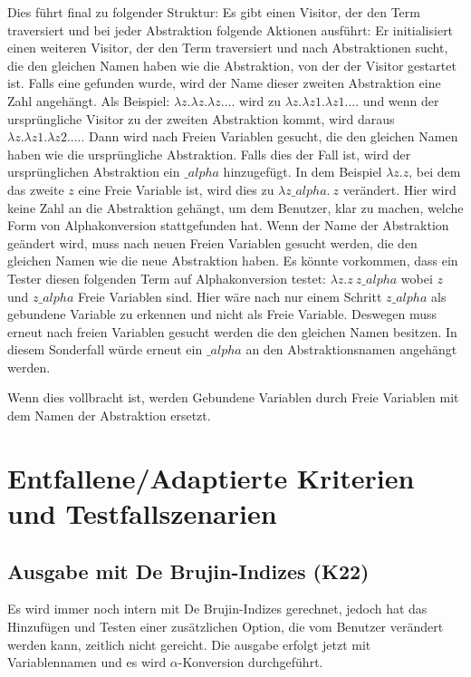 \documentclass[parskip=full,11pt,twoside]{scrartcl}
\begin{document}
{	Dies führt final zu folgender Struktur:
	Es gibt einen Visitor, der den Term traversiert und bei jeder Abstraktion folgende Aktionen ausführt:
	Er initialisiert einen weiteren Visitor, der den Term traversiert und nach Abstraktionen sucht, die den gleichen Namen
	haben wie die Abstraktion, von der der Visitor gestartet ist. Falls eine gefunden wurde, wird der Name dieser zweiten
	Abstraktion eine Zahl angehängt. Als Beispiel: $\lambda z. \lambda z. \lambda z. ...$ wird zu $\lambda z. \lambda z1. \lambda z1. ...$ und wenn der ursprüngliche Visitor zu der zweiten Abstraktion kommt, wird daraus $\lambda z. \lambda z1. \lambda z2. ...$.
	Dann wird nach Freien Variablen gesucht, die den gleichen Namen haben wie die ursprüngliche Abstraktion. Falls dies
	der Fall ist, wird der ursprünglichen Abstraktion ein $\_ alpha$ hinzugefügt. In dem Beispiel $\lambda z. z$, bei dem
	das zweite $z$ eine Freie Variable ist, wird dies zu $\lambda z \_ alpha. \  z$ verändert.
	Hier wird keine Zahl an die Abstraktion gehängt, um dem Benutzer, klar zu machen, welche Form von Alphakonversion
	stattgefunden hat.
	Wenn der Name der Abstraktion geändert wird, muss  nach neuen Freien Variablen gesucht werden, die den
	gleichen Namen wie die neue Abstraktion haben. Es könnte vorkommen,
	dass ein Tester diesen folgenden Term auf Alphakonversion testet: $\lambda z. z \ z\_ alpha$ wobei $z$ und
	$z\_ alpha$ Freie Variablen sind.
	Hier wäre nach nur einem Schritt $z\_ alpha$ als gebundene Variable zu erkennen und nicht als Freie Variable.
	Deswegen muss erneut nach freien Variablen gesucht werden die den gleichen Namen besitzen.
	In diesem Sonderfall würde erneut ein $\_ alpha$ an den Abstraktionsnamen angehängt werden.
	
	Wenn dies vollbracht ist, werden Gebundene Variablen durch Freie Variablen mit dem Namen der Abstraktion ersetzt.
	
	
}


    \section{Entfallene/Adaptierte Kriterien und Testfallszenarien}
    \subsection{Ausgabe mit De Brujin-Indizes (K22)}
    Es wird immer noch intern mit De Brujin-Indizes gerechnet, jedoch hat das Hinzufügen und Testen einer zusätzlichen
    Option, die vom Benutzer verändert werden kann, zeitlich nicht gereicht.
    Die ausgabe erfolgt jetzt mit Variablennamen und es wird $\alpha$-Konversion durchgeführt.
\end{document}
